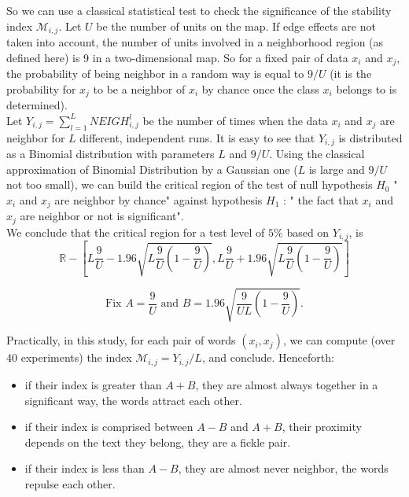 \documentclass[preprint]{elsarticle}
\begin{document}
So we can use a classical statistical test to check the significance of the stability index $\mathcal{M}_{i,j}$. Let $U$ be the number of units on the map. If edge effects are not taken into account, the number of units involved in a neighborhood region (as defined here) is 9 in a two-dimensional map. So for a fixed pair of data $x_i$ and $x_j$, the probability of being neighbor in a random way is equal to $9/U$ (it is the probability for $x_j$ to be a neighbor of $x_i$ by chance once the class $x_i$ belongs to is determined).\\

Let $Y_{i,j}= \sum_{l=1}^L NEIGH_{i,j}^l$ be the number of times when the data $x_i$ and $x_j$ are neighbor for $L$ different, independent runs. It is easy to see that $Y_{i,j}$ is distributed as a Binomial distribution with parameters $L$ and $9/U$. Using the classical approximation of Binomial Distribution by a Gaussian one ($L$ is large and $9/U$ not too small), we can build the critical region of the test of null hypothesis $H_0$ "$x_i$ and $x_j$ are neighbor by chance" against hypothesis $H_1$ : " the fact that $x_i$ and $x_j$ are neighbor or not is significant".\\

We conclude that the critical region for a test level of $5\%$ based on $Y_{i,j}$, is 
\begin{equation*} 
\mathbb{R} - [ L \frac{9}{U} - 1.96 \sqrt{L \frac{9}{U} ( 1 - \frac{9}{U})}, L \frac{9}{U} + 1.96 \sqrt{L \frac{9}{U} ( 1 - \frac{9}{U}) } ] 
\end{equation*}
 
\begin{equation}\label{AB}
\text {Fix } A = \frac{9}{U} \text{ and } B = 1.96 \sqrt{\frac{9}{UL} ( 1 - \frac{9}{U})}.
\end{equation}

Practically, in this study, for each pair of words $(x_i,x_j)$, we can compute (over 40 experiments) the index $\mathcal{M}_{i,j} = Y_{i,j}/L$, and conclude. Henceforth:\\
 
\begin{itemize}
\item if their index is greater than $A + B$, they are almost always together in a significant way, the words attract each other.
\item if their index is comprised between $A - B$ and $A+B$, their proximity depends on the text they belong, they are a fickle pair.
\item if their index is less than $A - B$, they are almost never neighbor, the words repulse each other.
\end{itemize}
\end{document}
